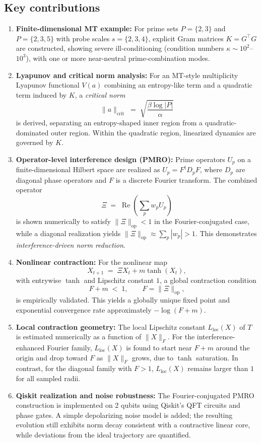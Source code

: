 \documentclass[11pt]{article}
\begin{document}
\subsection{Key contributions}

\begin{enumerate}[label=\Roman*.]
  \item \textbf{Finite-dimensional MT example:} For prime sets $P=\{2,3\}$ and $P=\{2,3,5\}$ with probe scales $s=\{2,3,4\}$, explicit Gram matrices $K=G^\top G$ are constructed, showing severe ill-conditioning (condition numbers $\kappa \sim 10^2$--$10^3$), with one or more near-neutral prime-combination modes.

  \item \textbf{Lyapunov and critical norm analysis:} For an MT-style multiplicity Lyapunov functional $V(a)$ combining an entropy-like term and a quadratic term induced by $K$, a \emph{critical norm}
  \[
    \|a\|_{\text{crit}} \;=\; \sqrt{\frac{\beta \log |P|}{\alpha}}
  \]
  is derived, separating an entropy-shaped inner region from a quadratic-dominated outer region. Within the quadratic region, linearized dynamics are governed by $K$.

  \item \textbf{Operator-level interference design (PMRO):} Prime operators $U_p$ on a finite-dimensional Hilbert space are realized as $U_p = F^\dagger D_p F$, where $D_p$ are diagonal phase operators and $F$ is a discrete Fourier transform. The combined operator
  \[
    \Xi \;=\; \operatorname{Re}\!\left(\sum_{p} w_p U_p\right)
  \]
  is shown numerically to satisfy $\|\Xi\|_{\mathrm{op}} < 1$ in the Fourier-conjugated case, while a diagonal realization yields $\|\Xi\|_{\mathrm{op}}\approx \sum_p |w_p| > 1$. This demonstrates \emph{interference-driven norm reduction}.

  \item \textbf{Nonlinear contraction:} For the nonlinear map
  \[
    X_{t+1} \;=\; \Xi X_t + m \tanh(X_t),
  \]
  with entrywise $\tanh$ and Lipschitz constant $1$, a global contraction condition
  \[
    F + m \;<\; 1,\qquad F = \|\Xi\|_{\mathrm{op}},
  \]
  is empirically validated. This yields a globally unique fixed point and exponential convergence rate approximately $-\log(F+m)$.

  \item \textbf{Local contraction geometry:} The local Lipschitz constant $L_{\text{loc}}(X)$ of $T$ is estimated numerically as a function of $\|X\|_F$. For the interference-enhanced Fourier family, $L_{\text{loc}}(X)$ is found to start near $F+m$ around the origin and drop toward $F$ as $\|X\|_F$ grows, due to $\tanh$ saturation. In contrast, for the diagonal family with $F>1$, $L_{\text{loc}}(X)$ remains larger than $1$ for all sampled radii.

  \item \textbf{Qiskit realization and noise robustness:} The Fourier-conjugated PMRO construction is implemented on 2 qubits using Qiskit's QFT circuits and phase gates. A simple depolarizing noise model is added; the resulting evolution still exhibits norm decay consistent with a contractive linear core, while deviations from the ideal trajectory are quantified.
\end{enumerate}
\end{document}
